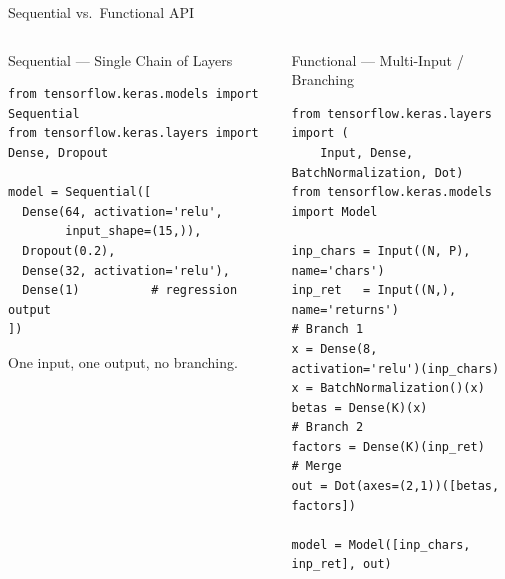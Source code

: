 \documentclass[aspectratio=169, 11pt]{beamer}
\begin{document}
\begin{frame}[fragile]{Sequential vs.\ Functional API}

\begin{columns}[T]
\begin{block}{\small Sequential --- Single Chain of Layers}
\begin{lstlisting}
from tensorflow.keras.models import Sequential
from tensorflow.keras.layers import Dense, Dropout

model = Sequential([
  Dense(64, activation='relu',
        input_shape=(15,)),
  Dropout(0.2),
  Dense(32, activation='relu'),
  Dense(1)          # regression output
])
\end{lstlisting}
\footnotesize One input, one output, no branching.
\end{block}

\begin{block}{\small Functional --- Multi-Input / Branching}
\begin{lstlisting}
from tensorflow.keras.layers import (
    Input, Dense, BatchNormalization, Dot)
from tensorflow.keras.models import Model

inp_chars = Input((N, P), name='chars')
inp_ret   = Input((N,),   name='returns')
# Branch 1
x = Dense(8, activation='relu')(inp_chars)
x = BatchNormalization()(x)
betas = Dense(K)(x)
# Branch 2
factors = Dense(K)(inp_ret)
# Merge
out = Dot(axes=(2,1))([betas, factors])

model = Model([inp_chars, inp_ret], out)
\end{lstlisting}
\end{block}
\end{columns}


\end{frame}
%
%
\end{document}
